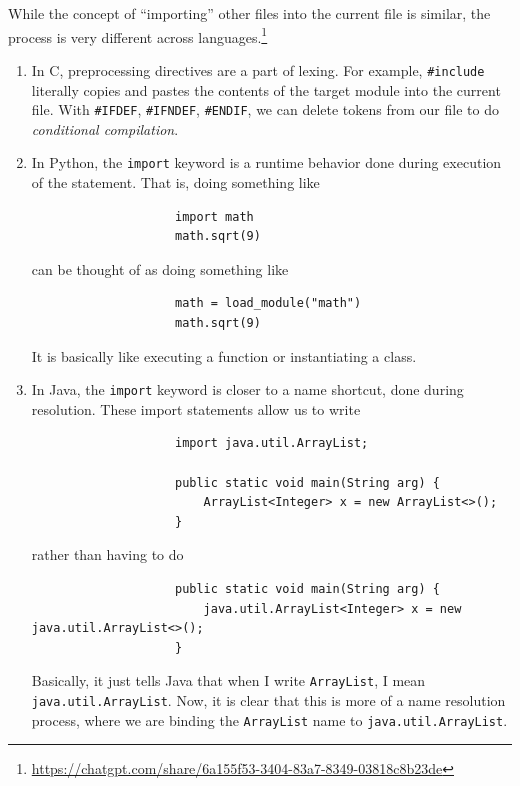 	\begin{example}
	  \label{ex:implementations-in-languages}
		While the concept of ``importing'' other files into the current file is similar, the process is very different across languages.\footnote{\href{https://chatgpt.com/share/6a155f53-3404-83a7-8349-03818c8b23de}{https://chatgpt.com/share/6a155f53-3404-83a7-8349-03818c8b23de}}

		\begin{enumerate}
			\item In C, preprocessing directives are a part of lexing. For example, \texttt{\#include} literally copies and pastes the contents of the target module into the current file. With \texttt{\#IFDEF}, \texttt{\#IFNDEF}, \texttt{\#ENDIF}, we can delete tokens from our file to do \textit{conditional compilation}. 

			\item In Python, the \texttt{import} keyword is a runtime behavior done during execution of the statement. That is, doing something like 
				\begin{lstlisting}
					import math 
					math.sqrt(9) 
				\end{lstlisting}

				can be thought of as doing something like 

				\begin{lstlisting}
					math = load_module("math") 
					math.sqrt(9)
				\end{lstlisting}

				It is basically like executing a function or instantiating a class.

			\item In Java, the \texttt{import} keyword is closer to a name shortcut, done during resolution. These import statements allow us to write 
				\begin{lstlisting}
					import java.util.ArrayList; 

					public static void main(String arg) {
						ArrayList<Integer> x = new ArrayList<>();
					}
				\end{lstlisting}
				
				rather than having to do 

				\begin{lstlisting}
					public static void main(String arg) {
						java.util.ArrayList<Integer> x = new java.util.ArrayList<>();
					}
				\end{lstlisting}

				Basically, it just tells Java that when I write \texttt{ArrayList}, I mean \texttt{java.util.ArrayList}. Now, it is clear that this is more of a name resolution process, where we are binding the \texttt{ArrayList} name to \texttt{java.util.ArrayList}. 
		\end{enumerate}
	\end{example}


